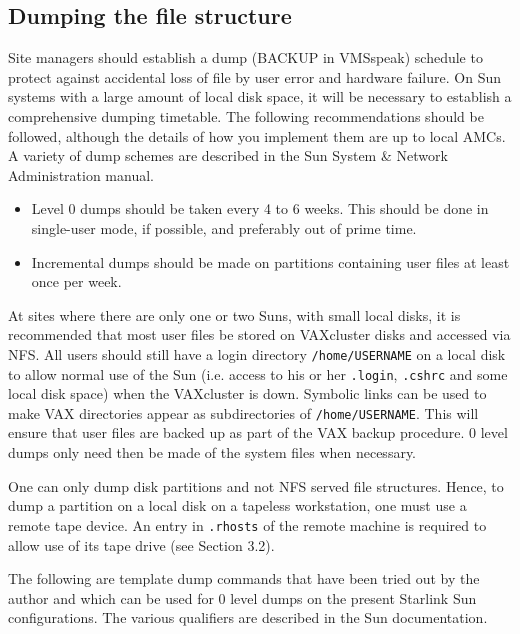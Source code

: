 \subsection{Dumping the file structure}

Site managers should establish a dump (BACKUP in VMSspeak) schedule
to protect against accidental loss of file by user error and hardware failure.
On Sun systems with a large amount of local disk space, it will be necessary
to establish a comprehensive dumping timetable. The following recommendations
should be followed, although the details of how you implement them are
up to local AMCs. A variety of dump schemes are described in the
Sun System \& Network Administration manual.

\begin{itemize}

\item Level 0 dumps should be taken every 4 to 6 weeks. This should be done
in single-user mode, if possible, and preferably out of prime time.

\item Incremental dumps should be made on partitions containing user files
at least once per week.

\end{itemize}

At sites where there are only one or two Suns, with small local disks, it is
recommended that most user files be stored on VAXcluster disks and accessed via
NFS. All users should still have a login directory {\tt /home/USERNAME} on a
local disk to allow normal use of the Sun (i.e. access to his or her
{\tt .login}, {\tt .cshrc}
and some local disk space) when the VAXcluster is down. Symbolic links
can be used to make VAX directories appear as subdirectories of
{\tt /home/USERNAME}.
This will ensure that user files are backed up as part of the VAX backup
procedure. 0 level dumps only need then be made of the system files when
necessary.

One can only dump disk partitions and not NFS served file structures. Hence,
to dump a partition on a local disk on a tapeless workstation, one must use
a remote tape device. An entry in {\tt .rhosts} of the remote machine is required
to allow use of its tape drive (see Section 3.2).

The following are template dump commands that have been tried out by the
author and which can be used for 0 level dumps on the present Starlink Sun
configurations. The various qualifiers are described  in the Sun documentation.

